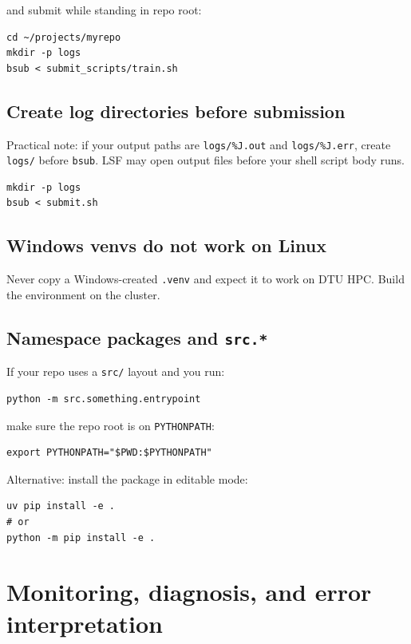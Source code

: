 \documentclass[11pt,a4paper]{article}
\begin{document}
and submit while standing in repo root:

\begin{lstlisting}[style=shell]
cd ~/projects/myrepo
mkdir -p logs
bsub < submit_scripts/train.sh
\end{lstlisting}

\subsection{Create log directories before submission}

Practical note: if your output paths are \texttt{logs/\%J.out} and \texttt{logs/\%J.err}, create \texttt{logs/} before \texttt{bsub}. LSF may open output files before your shell script body runs.

\begin{lstlisting}[style=shell]
mkdir -p logs
bsub < submit.sh
\end{lstlisting}

\subsection{Windows venvs do not work on Linux}

Never copy a Windows-created \texttt{.venv} and expect it to work on DTU HPC. Build the environment on the cluster.

\subsection{Namespace packages and \texttt{src.*}}

If your repo uses a \texttt{src/} layout and you run:

\begin{lstlisting}[style=shell]
python -m src.something.entrypoint
\end{lstlisting}

make sure the repo root is on \texttt{PYTHONPATH}:

\begin{lstlisting}[style=shell]
export PYTHONPATH="$PWD:$PYTHONPATH"
\end{lstlisting}

Alternative: install the package in editable mode:

\begin{lstlisting}[style=shell]
uv pip install -e .
# or
python -m pip install -e .
\end{lstlisting}

\section{Monitoring, diagnosis, and error interpretation}
\end{document}

